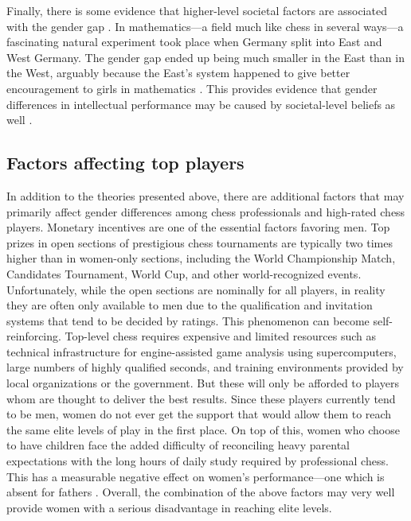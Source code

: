 \documentclass[9pt,twocolumn,twoside,lineno]{pnas-new}
\begin{document}
Finally, there is some evidence that higher-level societal factors are associated with the gender gap \cite{breda2020gender}. In mathematics---a field much like chess in several ways---a fascinating natural experiment took place when Germany split into East and West Germany. The gender gap ended up being much smaller in the East than in the West, arguably because the East's system happened to give better encouragement to girls in mathematics \cite{lippmann2018math}. This provides evidence that gender differences in intellectual performance may be caused by societal-level beliefs as well \cite{zhang2018, dilmaghani2021}.


\subsection*{Factors affecting top players}

In addition to the theories presented above, there are additional factors that may primarily affect gender differences among chess professionals and high-rated chess players. Monetary incentives are one of the essential factors favoring men. Top prizes in open sections of prestigious chess tournaments are typically two times higher than in women-only sections, including the World Championship Match, Candidates Tournament, World Cup, and other world-recognized events. Unfortunately, while the open sections are nominally for all players, in reality they are often only available to men due to the qualification and invitation systems that tend to be decided by ratings. This phenomenon can become self-reinforcing. Top-level chess requires expensive and limited resources such as technical infrastructure for engine-assisted game analysis using supercomputers, large numbers of highly qualified seconds, and training environments provided by local organizations or the government. But these will only be afforded to players whom are thought to deliver the best results. Since these players currently tend to be men, women do not ever get the support that would allow them to reach the same elite levels of play in the first place. On top of this, women who choose to have children face the added difficulty of reconciling heavy parental expectations with the long hours of daily study required by professional chess. This has a measurable negative effect on women's performance---one which is absent for fathers \cite{smerdon2022facts}. Overall, the combination of the above factors may very well provide women with a serious disadvantage in reaching elite levels.
\end{document}
